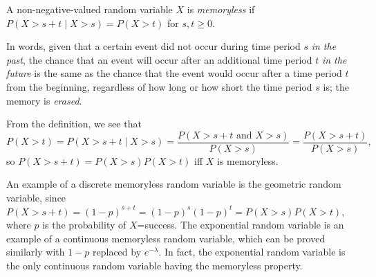 \documentclass[12pt]{article}
\begin{document}
A non-negative-valued random variable $X$ is \emph{memoryless} if 
$P(X>s+t\mid X>s)=P(X>t)$  for $s,t\ge0$.
\par
In words, given that a certain event did not occur during time period $s$ \emph{in the past}, the chance that an event will occur after an additional time period $t$ \emph{in the future} is the same as the chance that the event would occur after a time period $t$ from the beginning, regardless of how long or how short the time period $s$ is; the memory is \emph{erased}.  
\par
From the definition, we see that $$P(X>t)=P(X>s+t\mid X>s)=\frac{P(X>s+t\mbox{ and }X>s)}{P(X>s)}=\frac{P(X>s+t)}{P(X>s)},$$
so $P(X>s+t)=P(X>s)P(X>t)$ iff $X$ is memoryless.
\par
An example of a discrete memoryless random variable is the geometric random variable, since $P(X>s+t)=(1-p)^{s+t}=(1-p)^s(1-p)^t=P(X>s)P(X>t)$, where $p$ is the probability of $X$=success.  The exponential random variable is an example of a continuous memoryless random variable, which can be proved similarly with $1-p$ replaced by $e^{-\lambda}$.  In fact, the exponential random variable is the only continuous random variable having the memoryless property.
\end{document}
